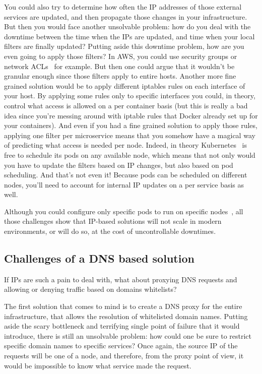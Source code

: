 You could also try to determine how often the IP addresses of those external services are updated, and then propagate those changes in your infrastructure. But then you would face another unsolvable problem: how do you deal with the downtime between the time when the IPs are updated, and time when your local filters are finally updated? Putting aside this downtime problem, how are you even going to apply those filters? In AWS, you could use security groups or network ACLs~\cite{ProcessLevelNetworkSecurityMonitoring:HeartinKanikathottu} for example. But then one could argue that it wouldn’t be granular enough since those filters apply to entire hosts. Another more fine grained solution would be to apply different iptables rules on each interface of your host. By applying some rules only to specific interfaces you could, in theory, control what access is allowed on a per container basis (but this is really a bad idea since you’re messing around with iptable rules that Docker already set up for your containers). And even if you had a fine grained solution to apply those rules, applying one filter per microservice means that you somehow have a magical way of predicting what access is needed per node. Indeed, in theory Kubernetes~\cite{ProcessLevelNetworkSecurityMonitoring:JohnArundelJustinDomingus} is free to schedule its pods on any available node, which means that not only would you have to update the filters based on IP changes, but also based on pod scheduling. And that’s not even it! Because pods can be scheduled on different nodes, you’ll need to account for internal IP updates on a per service basis as well.

Although you could configure only specific pods to run on specific nodes~\cite{ProcessLevelNetworkSecurityMonitoring:StefanSchimanskiMichaelHausenblas}, all those challenges show that IP-based solutions will not scale in modern environments, or will do so, at the cost of uncontrollable downtimes.

\subsection{Challenges of a DNS based solution}

If IPs are such a pain to deal with, what about proxying DNS requests and allowing or denying traffic based on domains whitelists?

The first solution that comes to mind is to create a DNS proxy for the entire infrastructure, that allows the resolution of whitelisted domain names. Putting aside the scary bottleneck and terrifying single point of failure that it would introduce, there is still an unsolvable problem: how could one be sure to restrict specific domain names to specific services? Once again, the source IP of the requests will be one of a node, and therefore, from the proxy point of view, it would be impossible to know what service made the request.


